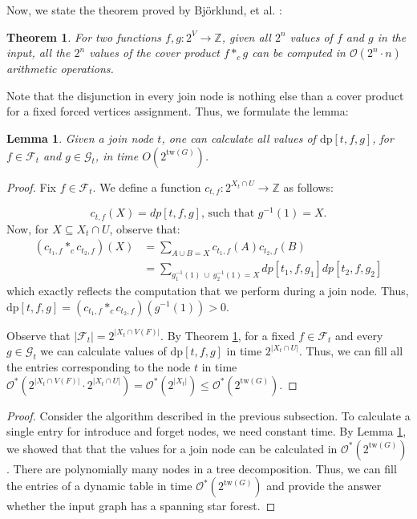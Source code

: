 \documentclass[en]{pracamgr}
\newtheorem{theorem}{Theorem}
\newtheorem{lemma}{Lemma}
\theoremstyle{definition}
\newcommand{\ssf}{spanning star forest}
\newcommand{\dpt}[1]{\textrm{dp}[#1]}
\newcommand{\tw}{\textrm{tw}}
\begin{document}
Now, we state the theorem proved by Björklund, et al. \cite{CoverProduct}:

\begin{theorem}\label{cproduct}
	For two functions $f,g:2^V \rightarrow \mathbb{Z}$, given all $2^n$ values of $f$ and $g$ in the input, all the $2^n$ values of the cover product $f*_cg$ can be computed in $\mathcal{O}(2^n\cdot n)$ arithmetic operations.
\end{theorem}

Note that the disjunction in every join node is nothing else than a cover product for a fixed forced vertices assignment. Thus, we formulate the lemma:

\begin{lemma}\label{join lemma}
	Given a join node $t$, one can calculate all values of $\dpt{t,f,g}$, for $f \in \mathcal{F}_t$ and $g \in \mathcal{G}_t$, in time $O(2^{\tw(G)})$.
\end{lemma}

\begin{proof}
	Fix $f \in \mathcal{F}_t$. We define a function $c_{t,f}:2^{X_t \cap U} \rightarrow \mathbb{Z}$ as follows:
	
	\begin{equation*}
		c_{t,f}(X) = dp[t,f,g] \text{, such that $g^{-1}(1) = X$}.
	\end{equation*}	
	Now, for $X \subseteq X_t \cap U$, observe that: 
	\begin{align*}
		(c_{t_1,f} *_c c_{t_2,f})(X) &= \sum\limits_{A \cup B = X} c_{t_1,f}(A)c_{t_2,f}(B) \\
		&= \sum\limits_{ g_1^{-1}(1)\ \cup\ g_2^{-1}(1) = X} dp[t_1,f,g_1]dp[t_2,f,g_2]	
	\end{align*}
	which exactly reflects the computation that we perform during a join node. Thus, $\dpt{t,f,g} = (c_{t_1,f} *_c c_{t_2,f})(g^{-1}(1)) > 0$. 
	
	Observe that $|\mathcal{F}_t| = 2^{|X_t \cap V(F)|}$. By Theorem \ref{cproduct}, for a fixed $f \in \mathcal{F}_t$ and every $g \in \mathcal{G}_t$ we can calculate values of $\dpt{t,f,g}$ in time $2^{|X_t \cap U|}$. Thus, we can fill all the entries corresponding to the node $t$ in time $\mathcal{O}^*(2^{|X_t \cap V(F)|} \cdot 2^{|X_t \cap U|}) = \mathcal{O}^*(2^{|X_t|}) \leq \mathcal{O}^*(2^{\tw(G)})$.
\end{proof}

\thmssfeptwtime*

\begin{proof}
	Consider the algorithm described in the previous subsection. To calculate a single entry for introduce and forget nodes, we need constant time. By Lemma \ref{join lemma}, we showed that that the values for a join node can be calculated in $\mathcal{O}^*(2^{\tw(G)})$. There are polynomially many nodes in a tree decomposition. Thus, we can fill the entries of a dynamic table in time $\mathcal{O}^*(2^{\tw(G)})$ and provide the answer whether the input graph has a \ssf{}.
\end{proof}
\end{document}
